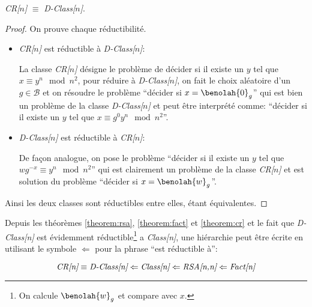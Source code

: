 	\begin{theorem} \emph{CR[$n$]} $\equiv$ \emph{D-Class[$n$]}.
		\label{theorem:cr}
		\begin{proof}
		On prouve chaque réductibilité.

			\begin{itemize} 
				\item \emph{CR[$n$]} est réductible à \emph{D-Class[$n$]}:

					La classe \emph{CR[$n$]} désigne le problème de décider si il existe
					un $y$ tel que $x \equiv y^n\mod{n^2}$, pour réduire à \emph{D-Class[$n$]}, on 
					fait le choix aléatoire d'un $g\in\mathcal{B}$ et on résoudre le problème 
					``décider si  $x=\benolah{0}_g$'' qui est bien un problème de la classe \emph{D-Class[$n$]}
					et peut être interprété comme: ``décider si il existe un $y$ tel que $x\equiv g^0y^n\mod{n^2}$''.

				\item \emph{D-Class[$n$]} est réductible à \emph{CR[$n$]}:
	
					De façon analogue, on pose le problème ``décider si il existe un $y$ tel que $wg^{-x}\equiv y^n\mod{n^2}$''
					qui est clairement un problème de la classe \emph{CR[$n$]} et est solution du problème 
					``décider si  $x=\benolah{w}_g$''.
			\end{itemize}
			Ainsi les deux classes sont réductibles entre elles, étant équivalentes. 
		\end{proof}
	\end{theorem}

	Depuis les théorèmes  \ref{theorem:rsa}, \ref{theorem:fact} et  \ref{theorem:cr} et le fait que 
	\emph{D-Class[n]} est évidemment réductible\footnote{On calcule $\benolah{w}_g$ et compare avec $x$.} a \emph{Class[n]},
	une hiérarchie peut être écrite en utilisant le symbole $\Leftarrow$ pour la 
	phrase ``est réductible à'':

	$$\emph{CR[n]} \equiv \emph{D-Class[n]} \Leftarrow \emph{Class[n]} \Leftarrow \emph{RSA[n,n]} \Leftarrow \emph{Fact[n]} $$
